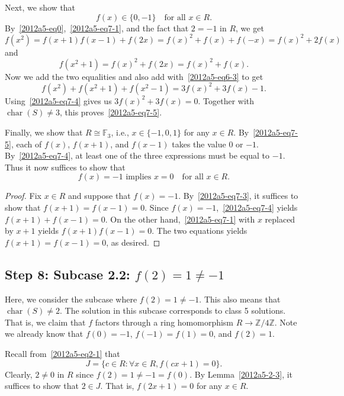 \documentclass{article}
\newcommand{\F}{\mathbb{F}}
\newcommand{\Z}{\mathbb{Z}}
\DeclareMathOperator{\rchar}{char}
\begin{document}
Next, we show that
\[ f(x) \in \{0, -1\} \quad \text{for all } x \in R. \tag{7.5}\label{2012a5-eq7-5} \]
By~\eqref{2012a5-eq0},~\eqref{2012a5-eq7-1}, and the fact that $2 = -1$ in $R$, we get
\[ f(x^2) = f(x + 1) f(x - 1) + f(2x) = f(x)^2 + f(x) + f(-x) = f(x)^2 + 2 f(x) \]
    and
\[ f(x^2 + 1) = f(x)^2 + f(2x) = f(x)^2 + f(x). \]
Now we add the two equalities and also add with~\eqref{2012a5-eq6-3} to get
\[ f(x^2) + f(x^2 + 1) + f(x^2 - 1) = 3 f(x)^2 + 3 f(x) - 1. \]
Using~\eqref{2012a5-eq7-4} gives us $3 f(x)^2 + 3 f(x) = 0$.
Together with $\rchar(S) \neq 3$, this proves~\eqref{2012a5-eq7-5}.

Finally, we show that $R \cong \F_3$, i.e., $x \in \{-1, 0, 1\}$ for any $x \in R$.
By~\eqref{2012a5-eq7-5}, each of $f(x)$, $f(x + 1)$, and $f(x - 1)$ takes the value $0$ or $-1$.
By~\eqref{2012a5-eq7-4}, at least one of the three expressions must be equal to $-1$.
Thus it now suffices to show that
\[ f(x) = -1 \text{ implies } x = 0 \quad \text{for all } x \in R. \tag{7.6}\label{2012a5-eq7-6} \]

\begin{proof}
Fix $x \in R$ and suppose that $f(x) = -1$.
By~\eqref{2012a5-eq7-3}, it suffices to show that $f(x + 1) = f(x - 1) = 0$.
Since $f(x) = -1$,~\eqref{2012a5-eq7-4} yields $f(x + 1) + f(x - 1) = 0$.
On the other hand,~\eqref{2012a5-eq7-1} with $x$ replaced by $x + 1$ yields $f(x + 1) f(x - 1) = 0$.
The two equations yields $f(x + 1) = f(x - 1) = 0$, as desired.
\end{proof}









\subsection*{Step 8: Subcase 2.2: $f(2) = 1 \neq -1$}

Here, we consider the subcase where $f(2) = 1 \neq -1$.
This also means that $\rchar(S) \neq 2$.
The solution in this subcase corresponds to class 5 solutions.
That is, we claim that $f$ factors through a ring homomorphism $R \to \Z/4\Z$.
Note we already know that $f(0) = -1$, $f(-1) = f(1) = 0$, and $f(2) = 1$.

Recall from~\eqref{2012a5-eq2-1} that
\[ J = \{c \in R : \forall x \in R, f(cx + 1) = 0\}. \]
Clearly, $2 \neq 0$ in $R$ since $f(2) = 1 \neq -1 = f(0)$.
By Lemma~\ref{2012a5-2-3}, it suffices to show that $2 \in J$.
That is, $f(2x + 1) = 0$ for any $x \in R$.
\end{document}
